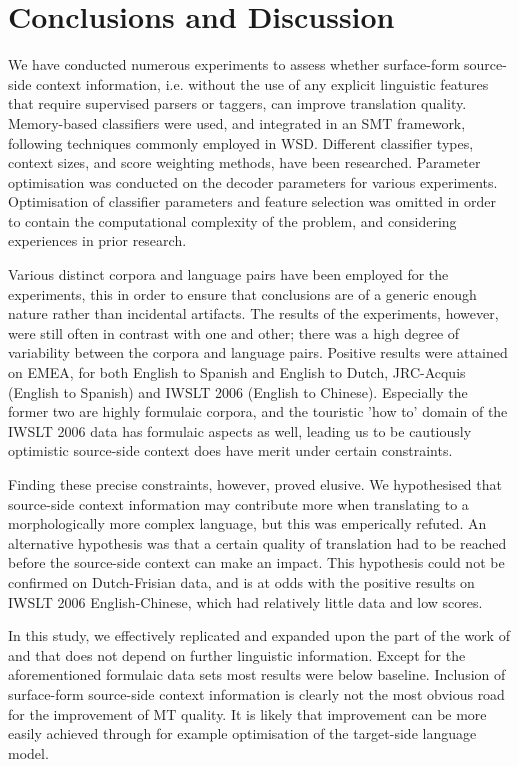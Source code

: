 \documentclass[smallextended]{svjour3}       %
\theoremstyle{break}
\begin{document}
\section{Conclusions and Discussion} 

We have conducted numerous experiments to assess whether surface-form
source-side context information, i.e. without the use of any explicit
linguistic features that require supervised parsers or taggers, can improve
translation quality. Memory-based classifiers were used, and integrated in an
SMT framework, following techniques commonly employed in WSD. Different
classifier types, context sizes, and score weighting methods, have been
researched. Parameter optimisation was conducted on the decoder parameters for
various experiments. Optimisation of classifier parameters and feature
selection was omitted in order to contain the computational complexity of the
problem, and considering experiences in prior research.

Various distinct corpora and language pairs have been employed for the
experiments, this in order to ensure that conclusions are of a generic
enough nature rather than incidental artifacts. The results of the
experiments, however, were still often in contrast with one and other;
there was a high degree of variability between the corpora and
language pairs. Positive results were attained on EMEA, for both
English to Spanish and English to Dutch, JRC-Acquis (English to
Spanish) and IWSLT 2006 (English to Chinese).  Especially the former
two are highly formulaic corpora, and the touristic 'how to' domain of
the IWSLT 2006 data has formulaic aspects as well, leading us to be
cautiously optimistic source-side context does have merit under
certain constraints.

Finding these precise constraints, however, proved elusive. We hypothesised that
source-side context information may contribute more when translating to a
morphologically more complex language, but this was emperically refuted.
An alternative hypothesis was that a certain quality of translation had to
be reached before the source-side context can make an impact. This hypothesis
could not be confirmed on Dutch-Frisian data, and is at odds with the positive
results on IWSLT 2006 English-Chinese, which had relatively little data and low
scores.

In this study, we effectively replicated and expanded upon the part of the work
of \cite{Stroppa+07} and \cite{Rejwanul+11} that does not depend on further
linguistic information. Except for the aforementioned formulaic data sets most
results were below baseline. Inclusion of surface-form source-side context
information is clearly not the most obvious road for the improvement of MT
quality. It is likely that improvement can be more easily achieved through for
example optimisation of the target-side language model.
\end{document}
